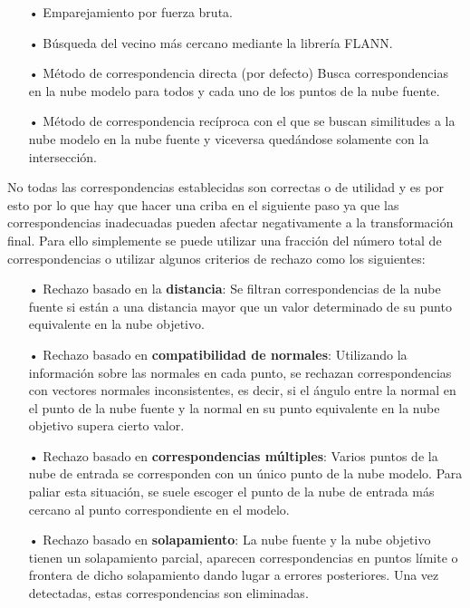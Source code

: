 \begin{itemize}
\item[•]Emparejamiento por fuerza bruta.
\item[•]Búsqueda del vecino más cercano mediante la librería FLANN.
\item[•]Método de correspondencia directa (por defecto) Busca correspondencias en la nube modelo para todos y cada uno de los puntos de la nube fuente.
\item[•]Método de correspondencia recíproca con el que se buscan similitudes a la nube modelo en la nube fuente y viceversa quedándose solamente con la intersección.
\end{itemize}

No todas las correspondencias establecidas son correctas o de utilidad y es por esto por lo que hay que hacer una criba en el siguiente paso ya que las correspondencias inadecuadas pueden afectar negativamente a la transformación final. Para ello simplemente se puede utilizar una fracción del número total de correspondencias o utilizar algunos criterios de rechazo como los siguientes\cite{paper_registration}:

\begin{itemize}
\item[•]Rechazo basado en la \textbf{distancia}:
Se filtran correspondencias de la nube fuente si están a una distancia mayor que un valor determinado de su punto equivalente en la nube objetivo.
\item[•]Rechazo basado en \textbf{compatibilidad de normales}:
Utilizando la información sobre las normales en cada punto, se rechazan correspondencias con vectores normales inconsistentes, es decir, si el ángulo entre la normal en el punto de la nube fuente y la normal en su punto equivalente en la nube objetivo supera cierto valor.
\item[•]Rechazo basado en \textbf{correspondencias múltiples}: 
Varios puntos de la nube de entrada se corresponden con un único punto de la nube modelo. Para paliar esta situación, se suele escoger el punto de la nube de entrada más cercano al punto correspondiente en el modelo.
\item[•]Rechazo basado en \textbf{solapamiento}:
La nube fuente y la nube objetivo tienen un solapamiento parcial, aparecen correspondencias en puntos límite o frontera de dicho solapamiento dando lugar a errores posteriores. Una vez detectadas, estas correspondencias son eliminadas. 
\end{itemize}

